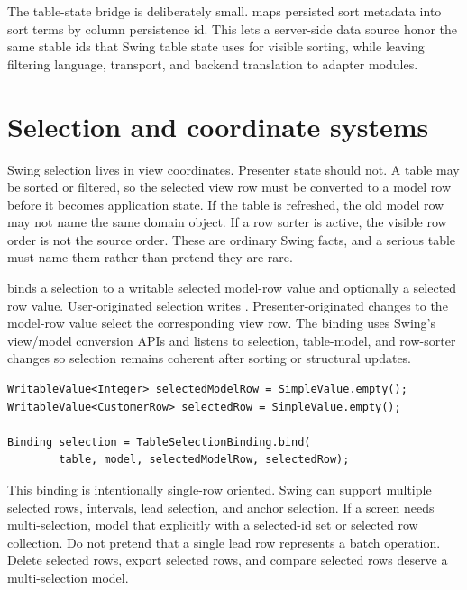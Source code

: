 The table-state bridge is deliberately small.
 maps persisted  sort metadata
into  sort terms by column persistence id. This lets a
server-side data source honor the same stable ids that Swing table state uses
for visible sorting, while leaving filtering language, transport, and backend
translation to adapter modules.

\section{Selection and coordinate systems}

Swing selection lives in view coordinates. Presenter state should not. A table
may be sorted or filtered, so the selected view row must be converted to a
model row before it becomes application state. If the table is refreshed, the
old model row may not name the same domain object. If a row sorter is active,
the visible row order is not the source order. These are ordinary Swing facts,
and a serious table must name them rather than pretend they are rare.

 binds a  selection to a writable
selected model-row value and optionally a selected row value. User-originated
selection writes . Presenter-originated changes to the
model-row value select the corresponding view row. The binding uses Swing's
view/model conversion APIs and listens to selection, table-model, and row-sorter
changes so selection remains coherent after sorting or structural updates.

\begin{lstlisting}[caption={Selection as model state.}]
WritableValue<Integer> selectedModelRow = SimpleValue.empty();
WritableValue<CustomerRow> selectedRow = SimpleValue.empty();

Binding selection = TableSelectionBinding.bind(
        table, model, selectedModelRow, selectedRow);
\end{lstlisting}

This binding is intentionally single-row oriented. Swing can support multiple
selected rows, intervals, lead selection, and anchor selection. If a screen
needs multi-selection, model that explicitly with a selected-id set or selected
row collection. Do not pretend that a single lead row represents a batch
operation. Delete selected rows, export selected rows, and compare selected
rows deserve a multi-selection model.

